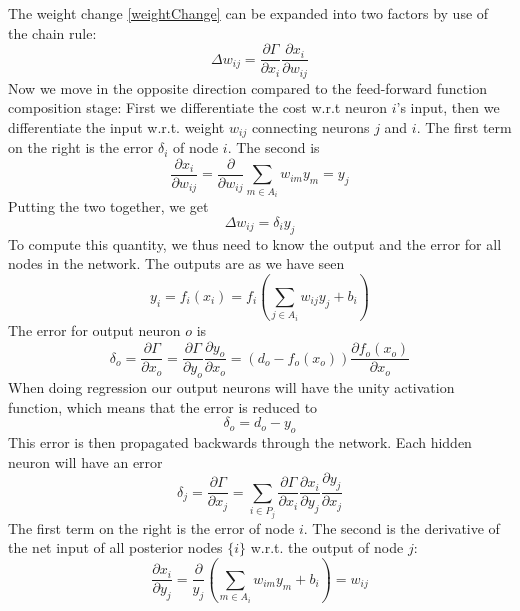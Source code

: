 \documentclass[twoside,english]{uiofysmaster}
\begin{document}
The weight change \eqref{weightChange} can be expanded into two factors by use of the chain rule:
\begin{equation}
 \Delta w_{ij} = \frac{\partial \Gamma}{\partial x_i}\frac{\partial x_i}{\partial w_{ij}}
\end{equation}
Now we move in the opposite direction compared to the feed-forward function composition stage: First we differentiate the cost w.r.t 
neuron $i$'s input, then we differentiate the input w.r.t. weight $w_{ij}$ connecting neurons $j$ and $i$. The first term on the right
is the error $\delta_i$ of node $i$. The second is
\begin{equation}
 \frac{\partial x_i}{\partial w_{ij}} = \frac{\partial}{\partial w_{ij}} \sum_{m\in A_i} w_{im}y_m = y_j
\end{equation}
Putting the two together, we get
\begin{equation}
 \Delta w_{ij} = \delta_i y_j
\end{equation}
To compute this quantity, we thus need to know the output and the error for all nodes in the network. 
The outputs are as we have seen
\begin{equation}
 y_i = f_i(x_i) = f_i\left(\sum_{j\in A_i} w_{ij}y_j + b_i\right)
 \label{forwardProp}
\end{equation}
The error for output neuron $o$ is
\begin{equation}
 \delta_o = \frac{\partial \Gamma}{\partial x_o} = \frac{\partial \Gamma}{\partial y_o}\frac{\partial y_o}{\partial x_o}
          = (d_o - f_o(x_o)) \frac{\partial f_o(x_o)}{\partial x_o}
\end{equation}
When doing regression our output neurons will have the unity activation function, which means that the error is reduced to
\begin{equation}
 \delta_o = d_o  - y_o
\end{equation}
This error is then propagated backwards through the network. Each hidden neuron will have an error
\begin{equation}
 \delta_j = \frac{\partial \Gamma}{\partial x_j} = 
 \sum_{i\in P_j} \frac{\partial \Gamma}{\partial x_i}\frac{\partial x_i}{\partial y_j}\frac{\partial y_j}{\partial x_j}
 \label{errorTerms}
\end{equation}
The first term on the right is the error of node $i$. The second is the derivative of the net input of all posterior
nodes $\{i\}$ w.r.t. the output of node $j$:
\begin{equation}
 \frac{\partial x_i}{\partial y_j} = \frac{\partial}{y_j}\left(\sum_{m\in A_i} w_{im}y_m + b_i\right) = w_{ij}
\end{equation}
\end{document}
